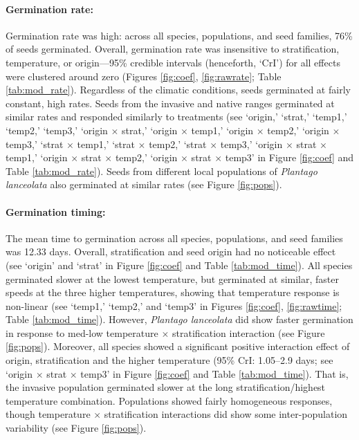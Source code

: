 \documentclass[12pt]{article}\usepackage[]{graphicx}\usepackage[]{color}
\begin{document}
	\paragraph{Germination rate:} Germination rate was high: across all species, populations, and seed families, 76\% of seeds germinated. Overall, germination rate was insensitive to stratification, temperature, or origin---95\% credible intervals (henceforth, `CrI') for all effects were clustered around zero (Figures \ref{fig:coef}, \ref{fig:rawrate}; Table \ref{tab:mod_rate}). Regardless of the climatic conditions, seeds germinated at fairly constant, high rates. Seeds from the invasive and native ranges germinated at similar rates and responded similarly to treatments (see `origin,' `strat,' `temp1,' `temp2,' `temp3,' `origin $\times$ strat,' `origin $\times$ temp1,' `origin $\times$ temp2,' `origin $\times$ temp3,' `strat $\times$ temp1,' `strat $\times$ temp2,' `strat $\times$ temp3,' `origin $\times$ strat $\times$ temp1,' `origin $\times$ strat $\times$ temp2,' `origin $\times$ strat $\times$ temp3' in Figure \ref{fig:coef} and Table \ref{tab:mod_rate}). Seeds from different local populations of \textit{Plantago lanceolata} also germinated at similar rates (see Figure \ref{fig:pops}).
	\paragraph{Germination timing:} The mean time to germination across all species, populations, and seed families was 12.33 days.   Overall, stratification and seed origin had no noticeable effect (see `origin' and `strat' in Figure \ref{fig:coef} and Table \ref{tab:mod_time}). All species germinated slower at the lowest temperature, but germinated at similar, faster speeds at the three higher temperatures, showing that temperature response is non-linear  (see `temp1,' `temp2,' and `temp3' in Figures \ref{fig:coef}, \ref{fig:rawtime}; Table \ref{tab:mod_time}). However, \textit{Plantago lanceolata} did show faster germination in response to med-low temperature $\times$ stratification interaction (see Figure \ref{fig:pops}).  Moreover, all species showed a significant positive interaction effect of origin, stratification and the higher temperature (95\% CrI: 1.05--2.9 days; see `origin $\times$ strat $\times$ temp3' in Figure \ref{fig:coef} and Table \ref{tab:mod_time}). That is, the invasive population germinated slower at the long stratification/highest temperature combination. Populations showed fairly homogeneous responses, though temperature $\times$ stratification interactions did show some inter-population variability (see Figure \ref{fig:pops}). 
\end{document}
